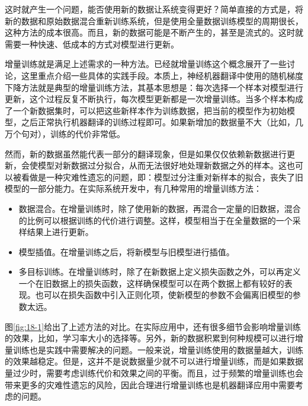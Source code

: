 \parinterval 这时就产生一个问题，能否使用新的数据让系统变得更好？简单直接的方式是，将新的数据和原始数据混合重新训练系统，但是使用全量数据训练模型的周期很长，这种方法的成本很高。而且，新的数据可能是不断产生的，甚至是流式的。这时就需要一种快速、低成本的方式对模型进行更新。

\parinterval 增量训练就是满足上述需求的一种方法。{\chapterthirteen}已经就增量训练这个概念展开了一些讨论，这里重点介绍一些具体的实践手段。本质上，神经机器翻译中使用的随机梯度下降方法就是典型的增量训练方法，其基本思想是：每次选择一个样本对模型进行更新，这个过程反复不断执行，每次模型更新都是一次增量训练。当多个样本构成了一个新数据集时，可以把这些新样本作为训练数据，把当前的模型作为初始模型，之后正常执行机器翻译的训练过程即可。如果新增加的数据量不大（比如，几万个句对），训练的代价非常低。

\parinterval 然而，新的数据虽然能代表一部分的翻译现象，但是如果仅仅依赖新数据进行更新，会使模型对新数据过分拟合，从而无法很好地处理新数据之外的样本。这也可以被看做是一种灾难性遗忘的问题，即：模型过分注重对新样本的拟合，丧失了旧模型的一部分能力。在实际系统开发中，有几种常用的增量训练方法：

\begin{itemize}
\vspace{0.5em}
\item 数据混合。在增量训练时，除了使用新的数据，再混合一定量的旧数据，混合的比例可以根据训练的代价进行调整。这样，模型相当于在全量数据的一个采样结果上进行更新。

\vspace{0.5em}
\item 模型插值。在增量训练之后，将新模型与旧模型进行插值。

\vspace{0.5em}
\item 多目标训练。在增量训练时，除了在新数据上定义损失函数之外，可以再定义一个在旧数据上的损失函数，这样确保模型可以在两个数据上都有较好的表现。也可以在损失函数中引入正则化项，使新模型的参数不会偏离旧模型的参数太远。

\vspace{0.5em}
\end{itemize}

\parinterval 图\ref{fig:18-1}给出了上述方法的对比。在实际应用中，还有很多细节会影响增量训练的效果，比如，学习率大小的选择等。另外，新的数据积累到何种规模可以进行增量训练也是实践中需要解决的问题。一般来说，增量训练使用的数据量越大，训练的效果越稳定。但是，这并不是说数据量少就不可以进行增量训练，而是如果数据量过少时，需要考虑训练代价和效果之间的平衡。而且，过于频繁的增量训练也会带来更多的灾难性遗忘的风险，因此合理进行增量训练也是机器翻译应用中需要考虑的问题。


